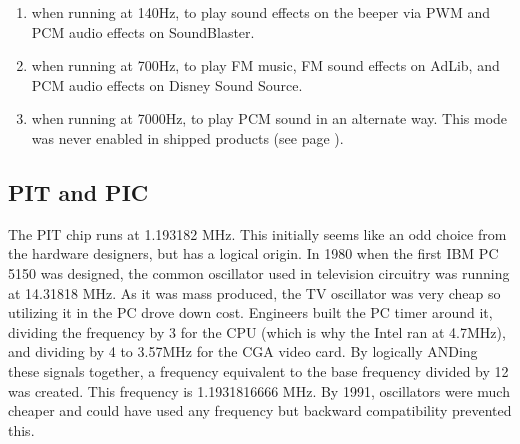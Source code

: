 \begin{enumerate}
\item {} when running at 140Hz, to play sound effects on the beeper via PWM and PCM audio effects on SoundBlaster.
\item {} when running at 700Hz, to play FM music, FM sound effects on AdLib, and PCM audio effects on Disney Sound Source.
\item {} when running at 7000Hz, to play PCM sound in an alternate way. This mode was never enabled in shipped products (see page \pageref{pcs_pcm}).
\end{enumerate}
\par



\subsection{PIT and PIC}
The PIT chip runs at 1.193182 MHz. This initially seems like an odd choice from the hardware designers, but has a logical origin. In 1980 when the first IBM PC 5150 was designed, the common oscillator used in television circuitry was running at 14.31818 MHz. As it was mass produced, the TV oscillator was very cheap so utilizing it in the PC drove down cost. Engineers built the PC timer around it, dividing the frequency by 3 for the CPU (which is why the Intel ran at 4.7MHz), and dividing by 4 to 3.57MHz for the CGA video card. By logically ANDing these signals together, a frequency equivalent to the base frequency divided by 12 was created. This frequency is 1.1931816666 MHz. By 1991, oscillators were much cheaper and could have used any frequency but backward compatibility prevented this.\\
\par














